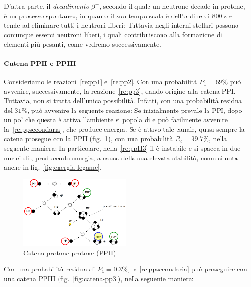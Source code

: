 D'altra parte, il \emph{decadimento $\beta^-$}, secondo il quale un neutrone decade in protone, è un processo spontaneo, in quanto il suo tempo scala è dell'ordine di $\SI{800}{s}$ e tende ad eliminare tutti i neutroni liberi:
Tuttavia negli interni stellari possono comunque esserci neutroni liberi, i quali contribuiscono alla formazione di elementi più pesanti, come vedremo successivamente.

\paragraph{Catena PPII e PPIII}
Consideriamo le reazioni~\ref{re:pp1} e~\ref{re:pp2}. Con una probabilità $P_1 = 69 \%$ può avvenire, successivamente, la reazione~\ref{re:pp3}, dando origine alla catena PPI. Tuttavia, non si tratta dell'unica possibilità. Infatti, con una probabilità residua del $31\%$, può avvenire la seguente reazione:
Se inizialmente prevale la PPI, dopo un po' che questa è attiva l'ambiente si popola di  e può facilmente avvenire la~\ref{re:ppsecondaria}, che produce energia. Se è attivo tale canale, quasi sempre la catena prosegue con la PPII (fig.~\ref{fig:catena-pp2}), con una probabilità $P_2=99.7\%$, nella seguente maniera:
In particolare, nella~\ref{re:ppII3} il  è instabile e si spacca in due nuclei di , producendo energia, a causa della sua elevata stabilità, come si nota anche in fig.~\ref{fig:energia-legame}.

\begin{figure}
    \centering
    \includegraphics[width=0.5\textwidth]{immagini/catena-pp2.png}
    \caption{Catena protone-protone (PPII).}
    \label{fig:catena-pp2}
\end{figure}

Con una probabilità residua di $P_3 = 0.3\%$, la \ref{re:ppsecondaria} può proseguire con una catena PPIII (fig.~\ref{fig:catena-pp3}), nella seguente maniera:

